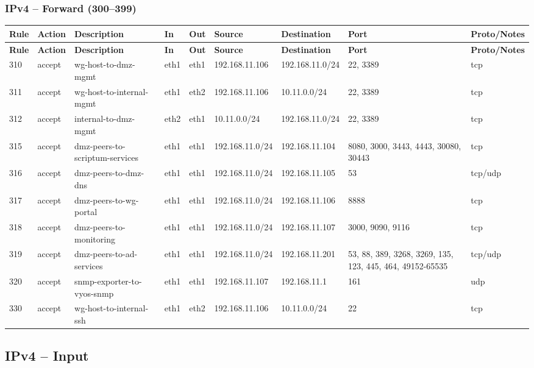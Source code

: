\documentclass[a4paper,11pt]{article}
\begin{document}
\begin{landscape}
\subsubsection{IPv4 -- Forward (300--399)}
\begin{longtable}{|l|l|l|l|l|l|l|p{2.2cm}|l|}
\hline
\textbf{Rule} & \textbf{Action} & \textbf{Description} & \textbf{In} & \textbf{Out} & \textbf{Source} & \textbf{Destination} & \textbf{Port} & \textbf{Proto/Notes} \\
\hline
\endfirsthead
\hline
\textbf{Rule} & \textbf{Action} & \textbf{Description} & \textbf{In} & \textbf{Out} & \textbf{Source} & \textbf{Destination} & \textbf{Port} & \textbf{Proto/Notes} \\
\hline
\endhead
310 & accept & wg-host-to-dmz-mgmt & eth1 & eth1 & 192.168.11.106 & 192.168.11.0/24 & 22, 3389 & tcp \\
311 & accept & wg-host-to-internal-mgmt & eth1 & eth2 & 192.168.11.106 & 10.11.0.0/24 & 22, 3389 & tcp \\
312 & accept & internal-to-dmz-mgmt & eth2 & eth1 & 10.11.0.0/24 & 192.168.11.0/24 & 22, 3389 & tcp \\
315 & accept & dmz-peers-to-scriptum-services & eth1 & eth1 & 192.168.11.0/24 & 192.168.11.104 & 8080, 3000, 3443, 4443, 30080, 30443 & tcp \\
316 & accept & dmz-peers-to-dmz-dns & eth1 & eth1 & 192.168.11.0/24 & 192.168.11.105 & 53 & tcp/udp \\
317 & accept & dmz-peers-to-wg-portal & eth1 & eth1 & 192.168.11.0/24 & 192.168.11.106 & 8888 & tcp \\
318 & accept & dmz-peers-to-monitoring & eth1 & eth1 & 192.168.11.0/24 & 192.168.11.107 & 3000, 9090, 9116 & tcp \\
319 & accept & dmz-peers-to-ad-services & eth1 & eth1 & 192.168.11.0/24 & 192.168.11.201 & 53, 88, 389, 3268, 3269, 135, 123, 445, 464, 49152-65535 & tcp/udp \\
320 & accept & snmp-exporter-to-vyos-snmp & eth1 & eth1 & 192.168.11.107 & 192.168.11.1 & 161 & udp \\
330 & accept & wg-host-to-internal-ssh & eth1 & eth2 & 192.168.11.106 & 10.11.0.0/24 & 22 & tcp \\
\hline
\end{longtable}

\subsection{IPv4 -- Input}


\end{landscape}
\end{document}
